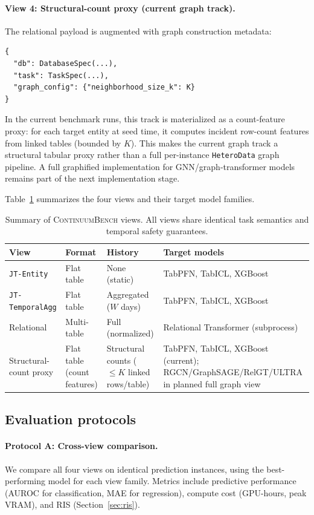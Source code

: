 \documentclass[11pt]{article}
\newcommand{\cb}{\textsc{ContinuumBench}}
\newcommand{\viewname}[1]{\texttt{#1}}
\begin{document}
\paragraph{View 4: Structural-count proxy (current graph track).}
The relational payload is augmented with graph construction metadata:
\begin{lstlisting}
{
  "db": DatabaseSpec(...),
  "task": TaskSpec(...),
  "graph_config": {"neighborhood_size_k": K}
}
\end{lstlisting}
In the current benchmark runs, this track is materialized as a
count-feature proxy: for each target entity at seed time, it computes
incident row-count features from linked tables (bounded by $K$).
This makes the current graph track a structural tabular proxy rather than
a full per-instance \texttt{HeteroData} graph pipeline.
A full graphified implementation for GNN/graph-transformer models remains
part of the next implementation stage.

Table~\ref{tab:view_summary} summarizes the four views and their
target model families.

\begin{table}[t]
\centering
\caption{Summary of \cb{} views. All views share identical task
semantics and temporal safety guarantees.}
\label{tab:view_summary}
\begin{tabular}{lllp{5cm}}
\toprule
View & Format & History & Target models \\
\midrule
\viewname{JT-Entity}       & Flat table   & None (static)         & TabPFN, TabICL, XGBoost \\
\viewname{JT-TemporalAgg}  & Flat table   & Aggregated ($W$ days) & TabPFN, TabICL, XGBoost \\
Relational                 & Multi-table  & Full (normalized)     & Relational Transformer (subprocess) \\
Structural-count proxy     & Flat table (count features)  & Structural counts ($\le K$ linked rows/table) & TabPFN, TabICL, XGBoost (current); RGCN/GraphSAGE/RelGT/ULTRA in planned full graph view \\
\bottomrule
\end{tabular}
\end{table}

\subsection{Evaluation protocols}

\paragraph{Protocol A: Cross-view comparison.}
We compare all four views on identical prediction instances, using the
best-performing model for each view family.
Metrics include predictive performance (AUROC for classification,
MAE for regression), compute cost (GPU-hours, peak VRAM), and RIS
(Section~\ref{sec:ris}).
\end{document}
